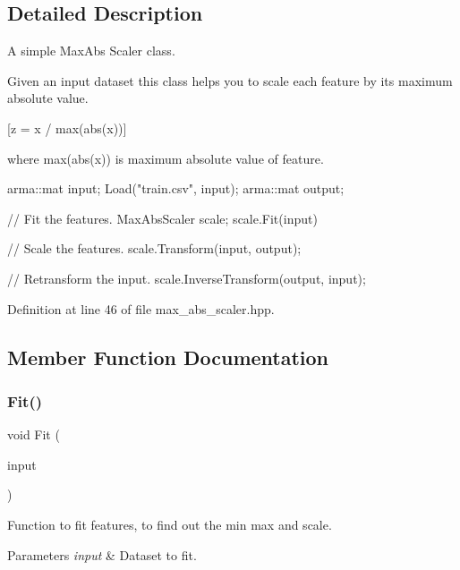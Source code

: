 \subsection{Detailed Description}
A simple Max\+Abs Scaler class. 

Given an input dataset this class helps you to scale each feature by its maximum absolute value.

[z = x / max(abs(x))]

where max(abs(x)) is maximum absolute value of feature.


\begin{DoxyCode}
arma::mat input;
Load(\textcolor{stringliteral}{"train.csv"}, input);
arma::mat output;

\textcolor{comment}{// Fit the features.}
MaxAbsScaler scale;
scale.Fit(input)

\textcolor{comment}{// Scale the features.}
scale.Transform(input, output);

\textcolor{comment}{// Retransform the input.}
scale.InverseTransform(output, input);
\end{DoxyCode}
 

Definition at line 46 of file max\+\_\+abs\+\_\+scaler.\+hpp.



\subsection{Member Function Documentation}
\mbox{\label{classmlpack_1_1data_1_1MaxAbsScaler_a0b68c1a39a21e56e10f5b9250b056244}} 
\subsubsection{Fit()}
{\footnotesize\ttfamily void Fit (\begin{DoxyParamCaption}\item[{const Mat\+Type \&}]{input }\end{DoxyParamCaption})\hspace{0.3cm}{\ttfamily [inline]}}



Function to fit features, to find out the min max and scale. 


\begin{DoxyParams}{Parameters}
{\em input} & Dataset to fit. \\
\hline
\end{DoxyParams}


